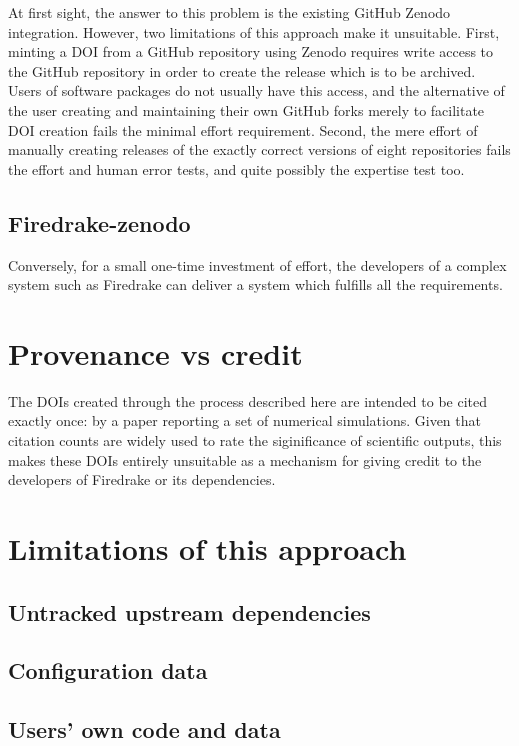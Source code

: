 \documentclass[a4paper,11pt]{article}
\begin{document}
At first sight, the answer to this problem is the existing GitHub
Zenodo integration. However, two limitations of this approach make it
unsuitable. First, minting a DOI from a GitHub repository using Zenodo
requires write access to the GitHub repository in order to create the
release which is to be archived. Users of software packages do not usually
have this access, and the alternative of the user creating and maintaining
their own GitHub forks merely to facilitate DOI creation fails the minimal
effort requirement. Second, the mere effort of manually creating releases of the
exactly correct versions of eight repositories fails the effort and human
error tests, and quite possibly the expertise test too.

\subsection{Firedrake-zenodo}

Conversely, for a small one-time investment of effort, the developers of a
complex system such as Firedrake can deliver a system which fulfills all the
requirements. 

\section{Provenance vs credit}

The DOIs created through the process described here are intended to be cited
exactly once: by a paper reporting a set of numerical simulations. Given
that citation counts are widely used to rate the siginificance of scientific
outputs, this makes these DOIs entirely unsuitable as a mechanism for giving
credit to the developers of Firedrake or its dependencies.

\section{Limitations of this approach}

\subsection{Untracked upstream dependencies}

\subsection{Configuration data}

\subsection{Users' own code and data}


\printbibliography
\end{document}
